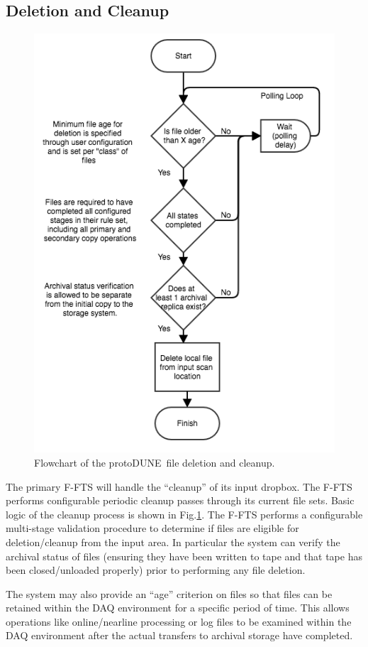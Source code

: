 \documentclass[pdftex,12pt,letter]{article}
\newcommand{\pd}{protoDUNE\ }
\begin{document}
\subsection{Deletion and Cleanup}

\begin{figure}[tbh]
\centering\includegraphics[width=0.5\linewidth]{fts_file_deletion_flowchart.png}
\caption{\label{fig:ftscleanup}Flowchart of the \pd file deletion and cleanup.}
\end{figure}
The primary F-FTS will handle the “cleanup” of its input dropbox. 
The F-FTS performs configurable periodic cleanup passes through its current file sets.  Basic logic of the cleanup process is shown in Fig.\ref{fig:ftscleanup}. 
The F-FTS performs a configurable multi-stage validation procedure to determine if files are eligible for deletion/cleanup from the input area.
In particular the system can verify the archival status of files (ensuring they have been written to tape and that tape has been closed/unloaded properly)
prior to performing any file deletion.

The system may also provide an ``age'' criterion on files so that files can be retained within the DAQ environment for a specific period of time.
This allows operations like online/nearline processing or log files to be examined within the DAQ environment after the actual transfers to archival
storage have completed.
\end{document}
